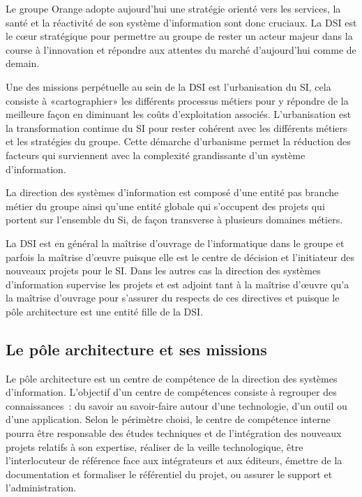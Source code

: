     Le groupe Orange adopte aujourd’hui une stratégie orienté vers les services, la santé et la réactivité de son système d’information sont donc cruciaux.
    La DSI est le cœur stratégique pour permettre au groupe de rester un acteur majeur dans la course à l’innovation et répondre aux attentes du marché d’aujourd’hui comme de demain.

    Une des missions perpétuelle au sein de la DSI est l’urbanisation du SI, cela consiste à  «cartographier» les différents processus métiers pour y répondre de la meilleure façon en diminuant les coûts d’exploitation associés.
    L’urbanisation est la transformation continue du SI pour rester cohérent avec les différents métiers et les stratégies du groupe.
    Cette démarche d’urbanisme permet la réduction des facteurs qui surviennent avec la complexité grandissante d’un système d’information.

    La direction des systèmes d’information est composé d’une entité pas branche métier du groupe ainsi qu’une entité globale qui s’occupent des projets qui portent sur l’ensemble du Si, de façon transverse à plusieurs domaines métiers.

    La DSI est en général la maîtrise d'ouvrage de l'informatique dans le groupe et parfois la maîtrise d'œuvre puisque elle est le centre de décision et l’initiateur des nouveaux projets pour le SI.
    Dans les autres cas la direction des systèmes d’information supervise les projets et est adjoint tant à la maîtrise d’œuvre qu’a la maîtrise d’ouvrage pour s’assurer du respects de ces directives et puisque le pôle architecture est une entité fille de la DSI.

    \subsection{Le pôle architecture et ses missions}

    Le pôle architecture est un centre de compétence de la direction des systèmes d’information.
    L’objectif d’un centre de compétences consiste à regrouper des connaissances : du savoir au savoir-faire autour d’une technologie, d’un outil ou d’une application.
    Selon le périmètre choisi, le centre de compétence interne pourra être responsable des études techniques et de l'intégration des nouveaux projets relatifs à son expertise, réaliser de la veille technologique, être l'interlocuteur de référence face aux intégrateurs et aux éditeurs, émettre de la documentation et formaliser le référentiel du projet, ou assurer le support et l'administration.

